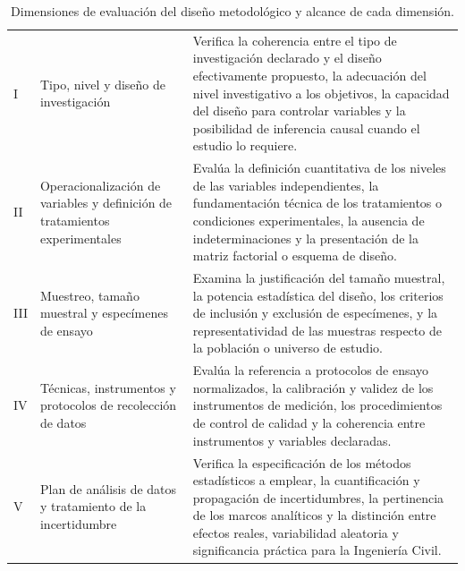 \begin{table}[htbp]
\centering
\scriptsize
\caption{Dimensiones de evaluación del diseño metodológico y alcance de cada dimensión.}
\label{tab:dim-metodologia}
\begin{tabularx}{\textwidth}{|C{0.8cm}|L{4.5cm}|X|}
\hline
{}
 &  &  \\ \hline
I & Tipo, nivel y diseño de investigación & Verifica la coherencia entre el tipo de investigación declarado y el diseño efectivamente propuesto, la adecuación del nivel investigativo a los objetivos, la capacidad del diseño para controlar variables y la posibilidad de inferencia causal cuando el estudio lo requiere. \\ \hline
{}
II & Operacionalización de variables y definición de tratamientos experimentales & Evalúa la definición cuantitativa de los niveles de las variables independientes, la fundamentación técnica de los tratamientos o condiciones experimentales, la ausencia de indeterminaciones y la presentación de la matriz factorial o esquema de diseño. \\ \hline
III & Muestreo, tamaño muestral y especímenes de ensayo & Examina la justificación del tamaño muestral, la potencia estadística del diseño, los criterios de inclusión y exclusión de especímenes, y la representatividad de las muestras respecto de la población o universo de estudio. \\ \hline
{}
IV & Técnicas, instrumentos y protocolos de recolección de datos & Evalúa la referencia a protocolos de ensayo normalizados, la calibración y validez de los instrumentos de medición, los procedimientos de control de calidad y la coherencia entre instrumentos y variables declaradas. \\ \hline
V & Plan de análisis de datos y tratamiento de la incertidumbre & Verifica la especificación de los métodos estadísticos a emplear, la cuantificación y propagación de incertidumbres, la pertinencia de los marcos analíticos y la distinción entre efectos reales, variabilidad aleatoria y significancia práctica para la Ingeniería Civil. \\ \hline
\end{tabularx}
\end{table}

